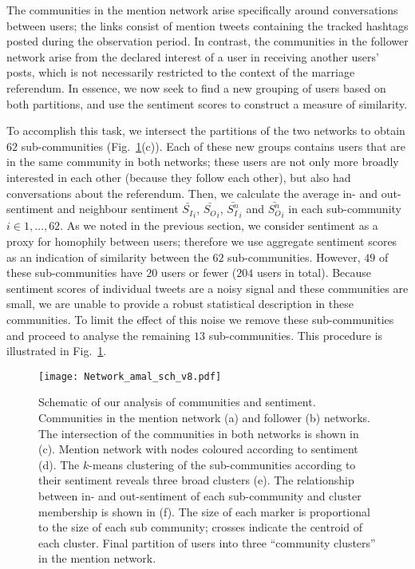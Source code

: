 \documentclass{article}
\newcommand{\MBD}[1]{\textcolor{blue}{{[\textbf{MBD:~#1}]}}}
\begin{document}
The communities in the mention network arise specifically around
conversations between users; the links consist of mention tweets
containing the tracked hashtags posted during the observation
period. In contrast, the communities in the follower network arise
from the declared interest of a user in receiving another users'
posts, which is not necessarily restricted to the context of the
marriage referendum.  In essence, we now seek to find a new grouping
of users based on both partitions, and use the sentiment scores to
construct a measure of similarity.

To accomplish this task, we intersect the partitions of the two
networks to obtain $62$ sub-communities
(Fig.~\ref{fig:communityAma}(c)). Each of these new groups contains
users that are in the same community in both networks; these users are
not only more broadly interested in each other (because they follow
each other), but also had conversations about the referendum.  Then,
we calculate the average in- and out-sentiment and neighbour sentiment
$\bar{S_I}_i$, $\bar{S_O}_i$, $\bar{S^{n}_I}_i$ and $\bar{S^{n}_O}_i$
in each sub-community $i\in{1, \dots , 62}$. As we noted in the
previous section, we consider sentiment as a proxy for homophily
between users; therefore we use aggregate sentiment scores as an
indication of similarity between the $62$ sub-communities. However,
$49$ of these sub-communities have $20$ users or fewer ($204$ users in
total).  Because sentiment scores of individual tweets are a noisy
signal and these communities are small, we are unable to provide a
robust statistical description in these communities.  To limit the
effect of this noise we remove these sub-communities and proceed to
analyse the remaining $13$ sub-communities.  This procedure is
illustrated in Fig.~\ref{fig:communityAma}.

\begin{figure}[tp]
  \centering
  \texttt{[image: Network\_amal\_sch\_v8.pdf]}
  \caption{Schematic of our analysis of communities and
    sentiment.  Communities in the mention network (a) and follower
    (b) networks.  The intersection of the communities in both
    networks is shown in (c).  Mention network with nodes coloured
    according to sentiment (d).  The $k$-means clustering of the
    sub-communities according to their sentiment reveals three broad
    clusters (e).  The relationship between in- and out-sentiment of
    each sub-community and cluster membership is shown in (f). The
    size of each marker is proportional to the size of each sub
    community; crosses indicate the centroid of each cluster.  Final
    partition of users into three ``community clusters'' in the
    mention network.}\label{fig:communityAma}
\end{figure}
\end{document}
